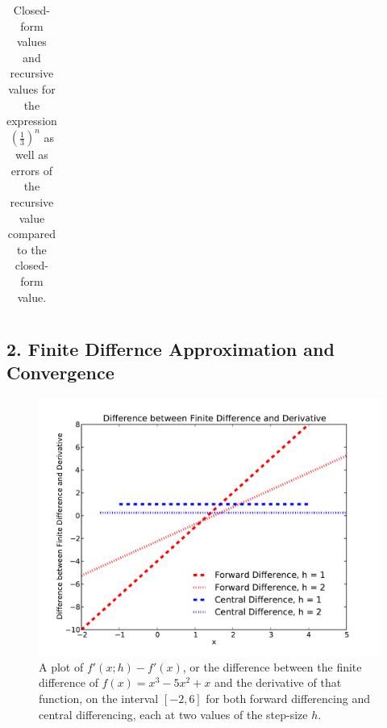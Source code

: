 \documentclass{article}
\begin{document}
\begin{spacing}{1.1}
\begin{table}[H]
\begin{tabular}{|l|l|l|l|l|}
	\hline
	\end{tabular}
	\caption{Closed-form values and recursive values for the expression \(\left(\frac{1}{3}\right)^n\) as well as errors of the recursive value compared to the closed-form value.}
	\end{table}
\newpage
\subsection{2. Finite Differnce Approximation and Convergence}

\begin{figure}[H]
 \label{fig2-1}
 \includegraphics[width=\textwidth]{problem2_fig1.pdf}
 \caption{A plot of \(f'(x;h) - f'(x)\), or the difference between the finite difference of \(f(x) = x^3 - 5x^2 + x\) and the derivative of that function, on the interval \([-2,6]\) for both forward differencing and central differencing, each at two values of the step-size \(h\).}
\end{figure} 


\end{spacing}
\end{document}
